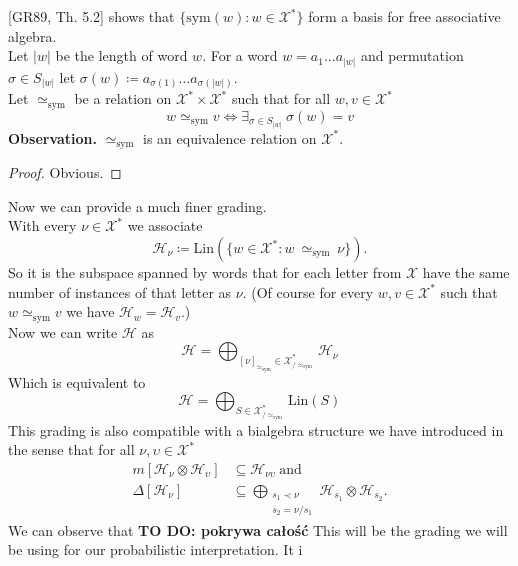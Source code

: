 \documentclass[a4paper, 12pt]{report}
\newcommand{\todo}[1]{\hfill \break \textbf{\Huge TO DO: #1 \hfill \break}\normalsize}
\newcommand{\SimeqSym}{{\simeq_\mathrm{sym}}}
\begin{document}
[GR89, Th. 5.2] shows that $\{\mathrm{sym}(w) : w \in \mathcal{X^*}\}$ form a basis for free associative
algebra. \\
Let $|w|$ be the length of word $w$. For a word $w = a_1\dots a_{|w|}$ and permutation
$\sigma \in S_{|w|}$ let $\sigma(w) \coloneqq a_{\sigma(1)}\dots a_{\sigma(|w|)}$. \\
Let $\simeq_\mathrm{sym}$ be
a relation on $\mathcal{X}^* \times \mathcal{X}^*$ such that for all $w, v \in \mathcal{X}^*$
\begin{equation*}
w \simeq_\mathrm{sym} v \iff \exists_{\sigma \in S_{|w|}}\ \sigma(w) = v
\end{equation*}
\textbf{Observation.} $\simeq_\mathrm{sym}$ is an equivalence relation on $\mathcal{X}^*$.
\begin{proof}
Obvious.
\end{proof}
\noindent Now we can provide a much finer grading. \\
With every $\nu \in \mathcal{X}^*$ we associate
\begin{equation}
\mathcal{H}_\nu \coloneqq \mathrm{Lin}(\{w \in \mathcal{X}^* : w\ \SimeqSym\ \nu\}).
\end{equation}
So it is the subspace spanned by words that for each letter from $\mathcal{X}$ have the same number of
instances of that letter as
$\nu$. (Of course for every $w, v \in \mathcal{X}^*$ such that $w \SimeqSym v$ we have
$\mathcal{H}_w = \mathcal{H}_v$.) \\
Now we can write $\mathcal{H}$ as
\begin{equation*}
\mathcal{H} = \bigoplus_{{[\nu]}_\SimeqSym \in \mathcal{X}^*_{/\SimeqSym}} \mathcal{H}_\nu
\end{equation*}
Which is equivalent to
\begin{equation*}
\mathcal{H} = \bigoplus_{S \in \mathcal{X}^*_{/\SimeqSym}} \mathrm{Lin}(S)
\end{equation*}
This grading is also compatible with a bialgebra structure we have introduced in the sense that for all
$\nu, \upsilon \in \mathcal{X}^*$
\begin{align*}
m[\mathcal{H}_\nu \otimes \mathcal{H}_\upsilon] &\subseteq \mathcal{H}_{\nu\upsilon} \mathrm{\ and} \\
\Delta[\mathcal{H}_\nu] &\subseteq \bigoplus_{\substack{s_1 \prec \nu \\ s_2 = \nu/ s_1}}
\mathcal{H}_{s_1} \otimes \mathcal{H}_{s_2}.
\end{align*}
We can observe that
\todo{pokrywa całość}
This will be the grading we will be using for our probabilistic interpretation. It i
\end{document}
